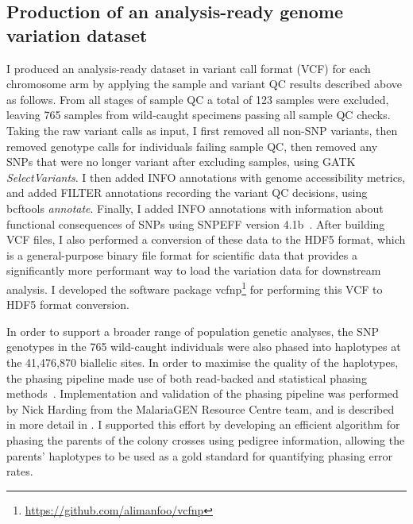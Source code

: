 \documentclass[a4paper,11pt,abstracton,hidelinks]{scrartcl}
\begin{document}
\subsection{Production of an analysis-ready genome variation dataset}\label{subsec:production-of-an-analysis-ready-dataset}


I produced an analysis-ready dataset in variant call format (VCF) for each chromosome arm by applying the sample and variant QC results described above as follows.
%
From all stages of sample QC a total of 123 samples were excluded, leaving 765 samples from wild-caught specimens passing all sample QC checks.
%
Taking the raw variant calls as input, I first removed all non-SNP variants, then removed genotype calls for individuals failing sample QC, then removed any SNPs that were no longer variant after excluding samples, using GATK \textit{SelectVariants}.
%
I then added INFO annotations with genome accessibility metrics, and added FILTER annotations recording the variant QC decisions, using bcftools \textit{annotate}.
%
Finally, I added INFO annotations with information about functional consequences of SNPs using SNPEFF version 4.1b~\parencite{Cingolani2012}.
%
After building VCF files, I also performed a conversion of these data to the HDF5 format, which is a general-purpose binary file format for scientific data that provides a significantly more performant way to load the variation data for downstream analysis.
%
I developed the software package vcfnp\footnote{\url{https://github.com/alimanfoo/vcfnp}} for performing this VCF to HDF5 format conversion.


In order to support a broader range of population genetic analyses, the SNP genotypes in the 765 wild-caught individuals were also phased into haplotypes at the 41,476,870 biallelic sites.
%
In order to maximise the quality of the haplotypes, the phasing pipeline made use of both read-backed and statistical phasing methods~\parencite{Delaneau2013}.
%
Implementation and validation of the phasing pipeline was performed by Nick Harding from the MalariaGEN Resource Centre team, and is described in more detail in \textcite{Ag1000G2017}.
%
I supported this effort by developing an efficient algorithm for phasing the parents of the colony crosses using pedigree information, allowing the parents' haplotypes to be used as a gold standard for quantifying phasing error rates. 
\end{document}
